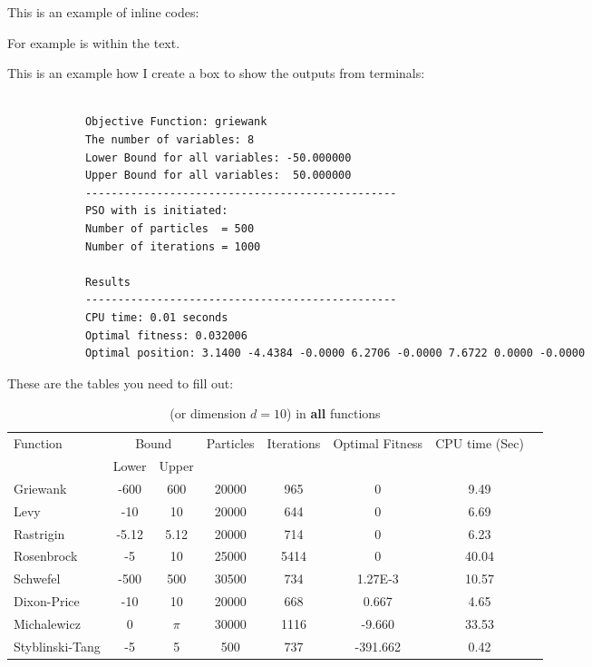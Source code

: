 \documentclass[12pt]{article}
\begin{document}
	
	
	
	
	This is an example of inline codes:
	
	{\scriptsize {}}
	
	
	For example  is within the text.
	
	This is an example how I create a box to show the outputs from terminals:
	
	\begin{mdframed}[style=myboxstyleTerminal1]
		\footnotesize
		\begin{verbatim}
			
			Objective Function: griewank
			The number of variables: 8
			Lower Bound for all variables: -50.000000
			Upper Bound for all variables:  50.000000
			------------------------------------------------
			PSO with is initiated:
			Number of particles  = 500
			Number of iterations = 1000 
			
			Results
			------------------------------------------------
			CPU time: 0.01 seconds
			Optimal fitness: 0.032006
			Optimal position: 3.1400 -4.4384 -0.0000 6.2706 -0.0000 7.6722 0.0000 -0.0000
		\end{verbatim}
	\end{mdframed}
	
	These are the tables you need to fill out:
	
	\begin{table}[H]
		\caption{ (or dimension $d=10$) in \textbf{all} functions}
		\label{table:1}
		\centering
		\begin{tabular}{l c c c c c c c}
			\hline
			Function &  \multicolumn{2}{c}{Bound} & Particles & Iterations &  Optimal Fitness & CPU time (Sec) \\
			& Lower& Upper&&&\\
			\hline
			Griewank  		&  -600   & 600 	&20000 &965  &0  &9.49 &\\
			Levy 	  		&  -10    & 10 		&20000 &644 &0 &6.69 &\\
			Rastrigin 		&  -5.12  & 5.12 	&20000 &714 &0 &6.23 &\\
			Rosenbrock		&  -5     & 10 		&25000 &5414 &0 &40.04 &\\
			Schwefel 	 	&  -500   & 500 	&30500 &734 &1.27E-3 &10.57 &\\
			Dixon-Price 	&   -10	  & 10 		&20000 &668 &0.667 &4.65 &\\
			Michalewicz 	&   0 	  & $\pi$ 	&30000 &1116 &-9.660 &33.53 &\\
			Styblinski-Tang & -5 	  & 5  		&500 &737 &-391.662 &0.42 &\\
			\hline
		\end{tabular}
	\end{table}
	
\end{document}
